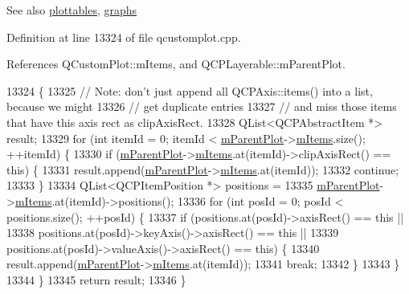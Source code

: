 \begin{DoxySeeAlso}{See also}
\hyperlink{class_q_c_p_axis_rect_a5b0d629c8de5572945eeae79a142296e}{plottables}, \hyperlink{class_q_c_p_axis_rect_afa4ff90901d9275f670e24b40e3c1b25}{graphs} 
\end{DoxySeeAlso}


Definition at line 13324 of file qcustomplot.\+cpp.



References Q\+Custom\+Plot\+::m\+Items, and Q\+C\+P\+Layerable\+::m\+Parent\+Plot.


\begin{DoxyCode}
13324                                                   \{
13325   \textcolor{comment}{// Note: don't just append all QCPAxis::items() into a list, because we might}
13326   \textcolor{comment}{// get duplicate entries}
13327   \textcolor{comment}{//       and miss those items that have this axis rect as clipAxisRect.}
13328   QList<QCPAbstractItem *> result;
13329   \textcolor{keywordflow}{for} (\textcolor{keywordtype}{int} itemId = 0; itemId < \hyperlink{class_q_c_p_layerable_aa2a528433e44db02b8aef23c1f9f90ed}{mParentPlot}->\hyperlink{class_q_custom_plot_afa5fd6957169dfef2e4e7815a04c36e0}{mItems}.size(); ++itemId) \{
13330     \textcolor{keywordflow}{if} (\hyperlink{class_q_c_p_layerable_aa2a528433e44db02b8aef23c1f9f90ed}{mParentPlot}->\hyperlink{class_q_custom_plot_afa5fd6957169dfef2e4e7815a04c36e0}{mItems}.at(itemId)->clipAxisRect() == \textcolor{keyword}{this}) \{
13331       result.append(\hyperlink{class_q_c_p_layerable_aa2a528433e44db02b8aef23c1f9f90ed}{mParentPlot}->\hyperlink{class_q_custom_plot_afa5fd6957169dfef2e4e7815a04c36e0}{mItems}.at(itemId));
13332       \textcolor{keywordflow}{continue};
13333     \}
13334     QList<QCPItemPosition *> positions =
13335         \hyperlink{class_q_c_p_layerable_aa2a528433e44db02b8aef23c1f9f90ed}{mParentPlot}->\hyperlink{class_q_custom_plot_afa5fd6957169dfef2e4e7815a04c36e0}{mItems}.at(itemId)->positions();
13336     \textcolor{keywordflow}{for} (\textcolor{keywordtype}{int} posId = 0; posId < positions.size(); ++posId) \{
13337       \textcolor{keywordflow}{if} (positions.at(posId)->axisRect() == \textcolor{keyword}{this} ||
13338           positions.at(posId)->keyAxis()->axisRect() == \textcolor{keyword}{this} ||
13339           positions.at(posId)->valueAxis()->axisRect() == \textcolor{keyword}{this}) \{
13340         result.append(\hyperlink{class_q_c_p_layerable_aa2a528433e44db02b8aef23c1f9f90ed}{mParentPlot}->\hyperlink{class_q_custom_plot_afa5fd6957169dfef2e4e7815a04c36e0}{mItems}.at(itemId));
13341         \textcolor{keywordflow}{break};
13342       \}
13343     \}
13344   \}
13345   \textcolor{keywordflow}{return} result;
13346 \}
\end{DoxyCode}
\hypertarget{class_q_c_p_axis_rect_a55b3ecf72a3a65b053f7651b88db458d}{}
